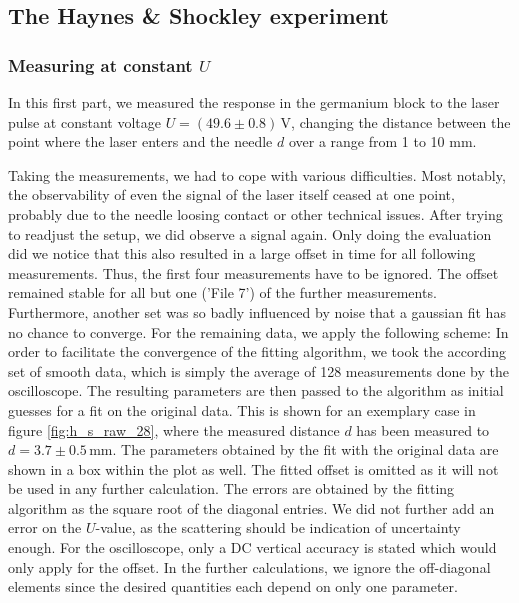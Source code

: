 \subsection{The Haynes \& Shockley experiment}
\subsubsection{Measuring at constant $U$}
In this first part, we measured the response in the germanium block to 
the laser pulse at constant voltage $U = (49.6 \pm 0.8)\,$V, 
changing the distance between the point where the laser enters 
and the needle $d$ over a range from 1 to 10 mm. 

Taking the measurements, we had to cope with various difficulties. 
Most notably, the observability of even the signal 
of the laser itself ceased at one point, probably due to the needle 
loosing contact or other technical issues. 
After trying to readjust the setup, we did observe a signal 
again. 
Only doing the evaluation did we notice that this also resulted in 
a large offset in time for all following measurements. 
Thus, the first four measurements have to be ignored. The offset 
remained stable for all but one ('File 7') of the further measurements. 
Furthermore, another set was so badly influenced by noise that 
a gaussian fit has no chance to converge. 
For the remaining data, we apply the following scheme: 
In order to facilitate the convergence of the fitting algorithm, 
we took the according set of smooth data, which is simply the 
average of 128 measurements done by the oscilloscope. 
The resulting parameters are then passed to the algorithm
as initial guesses for a fit on the original data. 
This is shown for an exemplary case in figure \ref{fig:h_s_raw_28}, 
where the measured distance $d$ has been measured to 
$d = 3.7 \pm 0.5\,$mm. 
The parameters obtained by the fit with the original data 
are shown in a box within the plot as well. 
The fitted offset is omitted as it will not be used in any further 
calculation. The errors 
are obtained by the fitting algorithm as the square root of the 
diagonal entries. We did not further add an error on the 
$U$-value, as the scattering should be indication of 
uncertainty enough. For the oscilloscope, only 
a DC vertical accuracy is stated which would 
only apply for the offset. 
In the further calculations, we ignore the 
off-diagonal elements since the desired quantities each depend 
on only one parameter. 
